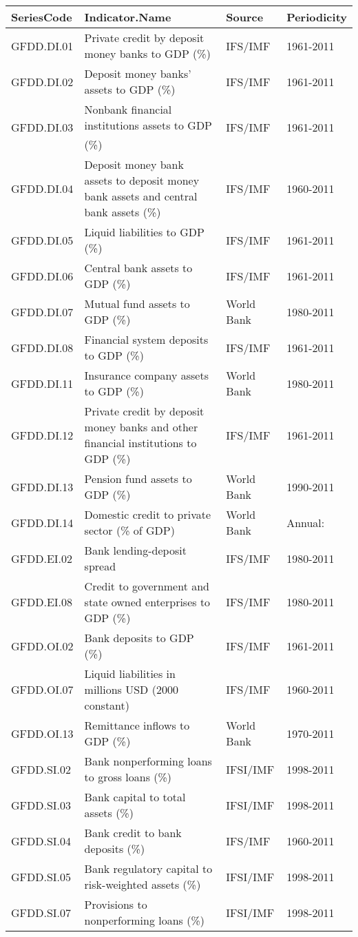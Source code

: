 {\scriptsize
\begin{tabular}{llll}
  \hline
SeriesCode & Indicator.Name & Source & Periodicity \\ 
  \hline
GFDD.DI.01 & Private credit by deposit money banks to GDP (\%) & IFS/IMF & 1961-2011 \\ 
  GFDD.DI.02 & Deposit money banks' assets to GDP (\%) & IFS/IMF & 1961-2011 \\ 
  GFDD.DI.03 & Nonbank financial institutions assets to GDP (\%) & IFS/IMF & 1961-2011 \\ 
  GFDD.DI.04 & Deposit money bank assets to deposit money bank assets and central bank assets (\%) & IFS/IMF & 1960-2011 \\ 
  GFDD.DI.05 & Liquid liabilities to GDP (\%) & IFS/IMF & 1961-2011 \\ 
  GFDD.DI.06 & Central bank assets to GDP (\%) & IFS/IMF & 1961-2011 \\ 
  GFDD.DI.07 & Mutual fund assets to GDP (\%) & World Bank & 1980-2011 \\ 
  GFDD.DI.08 & Financial system deposits to GDP (\%) & IFS/IMF & 1961-2011 \\ 
  GFDD.DI.11 & Insurance company assets to GDP (\%) & World Bank & 1980-2011 \\ 
  GFDD.DI.12 & Private credit by deposit money banks and other financial institutions to GDP (\%) & IFS/IMF & 1961-2011 \\ 
  GFDD.DI.13 & Pension fund assets to GDP (\%) & World Bank & 1990-2011 \\ 
  GFDD.DI.14 & Domestic credit to private sector (\% of GDP) & World Bank & Annual: \\ 
  GFDD.EI.02 & Bank lending-deposit spread & IFS/IMF & 1980-2011 \\ 
  GFDD.EI.08 & Credit to government and state owned enterprises to GDP (\%) & IFS/IMF & 1980-2011 \\ 
  GFDD.OI.02 & Bank deposits to GDP (\%) & IFS/IMF & 1961-2011 \\ 
  GFDD.OI.07 & Liquid liabilities in millions USD (2000 constant) & IFS/IMF & 1960-2011 \\ 
  GFDD.OI.13 & Remittance inflows to GDP (\%) & World Bank & 1970-2011 \\ 
  GFDD.SI.02 & Bank nonperforming loans to gross loans (\%) & IFSI/IMF & 1998-2011 \\ 
  GFDD.SI.03 & Bank capital to total assets (\%) & IFSI/IMF & 1998-2011 \\ 
  GFDD.SI.04 & Bank credit to bank deposits (\%) & IFS/IMF & 1960-2011 \\ 
  GFDD.SI.05 & Bank regulatory capital to risk-weighted assets (\%) & IFSI/IMF & 1998-2011 \\ 
  GFDD.SI.07 & Provisions to nonperforming loans (\%) & IFSI/IMF & 1998-2011 \\ 
   \hline
\end{tabular}
}
